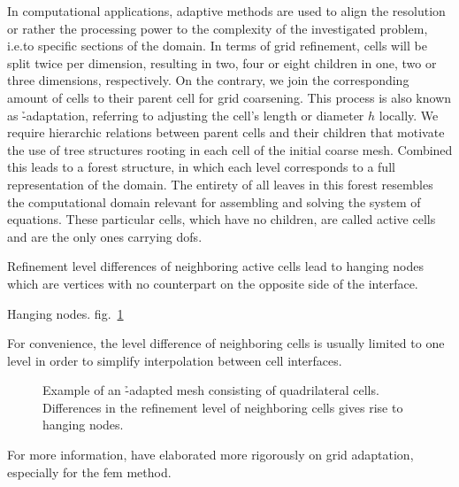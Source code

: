
In computational applications, adaptive methods are used to align the resolution or rather the processing power to the complexity of the investigated problem, i.e.\@ to specific sections of the domain. In terms of grid refinement, cells will be split twice per dimension, resulting in two, four or eight children in one, two or three dimensions, respectively. On the contrary, we join the corresponding amount of cells to their parent cell for grid coarsening. This process is also known as \h-adaptation, referring to adjusting the cell's length or diameter \(h\) locally. We require hierarchic relations between parent cells and their children that motivate the use of tree structures rooting in each cell of the initial coarse mesh. Combined this leads to a forest structure, in which each level corresponds to a full representation of the domain. The entirety of all leaves in this forest resembles the computational domain relevant for assembling and solving the system of equations. These particular cells, which have no children, are called active cells and are the only ones carrying \glspl{dof}.

Refinement level differences of neighboring active cells lead to hanging nodes which are vertices with no counterpart on the opposite side of the interface.

Hanging nodes.
fig.~\ref{fig:hangingnodes}

For convenience, the level difference of neighboring cells is usually limited to one level in order to simplify interpolation between cell interfaces.



\begin{figure}
  \centering
  \caption{Example of an \h-adapted mesh consisting of quadrilateral cells. Differences in the refinement level of neighboring cells gives rise to hanging nodes.}
  \label{fig:hangingnodes}
\end{figure}

For more information, \textcite{bangerth2003} have elaborated more rigorously on grid adaptation, especially for the \gls{fem} method.

